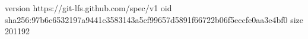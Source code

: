 version https://git-lfs.github.com/spec/v1
oid sha256:97b6c6532197a9441c3583143a5cf99657d5891f66722b06f5eccfe0aa3e4bf0
size 201192
